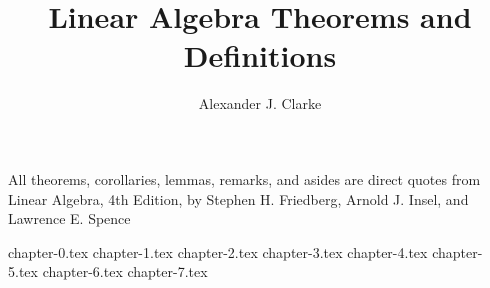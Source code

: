 \documentclass[12pt,letterpaper]{report}
\author{Alexander J. Clarke}
\title{Linear Algebra Theorems and Definitions}
\begin{document}
\maketitle
\clearpage
\begin{center}
	\thispagestyle{empty}
	\vspace*{\fill}
	All theorems, corollaries, lemmas, remarks, and asides are direct quotes from Linear Algebra, 4th Edition, by Stephen H. Friedberg, Arnold J. Insel, and Lawrence E. Spence
	\vspace*{\fill}
\end{center}
\tableofcontents

{chapter-0.tex}
{chapter-1.tex}
{chapter-2.tex}
{chapter-3.tex}
{chapter-4.tex}
{chapter-5.tex}
{chapter-6.tex}
{chapter-7.tex}
\end{document}
